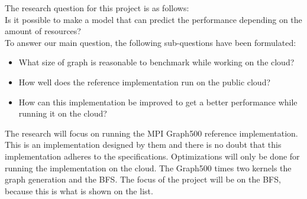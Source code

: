The research question for this project is as follows: \\
Is it possible to make a model that can predict the performance depending on the amount of resources? \\
To answer our main question, the following sub-questions have been formulated: 
\begin{itemize}
\item What size of graph is reasonable to benchmark while working on the cloud?
\item How well does the reference implementation\cite{graph500-code} run on the public cloud?
\item How can this implementation be improved to get a better performance while running it on the cloud?
\end{itemize}

The research will focus on running the MPI Graph500 reference implementation. This is an implementation designed by them and there is no doubt that this implementation adheres to the specifications. Optimizations will only be done for running the implementation on the cloud.
The Graph500 times two kernels the graph generation and the BFS. The focus of the project will be on the BFS, because this is what is shown on the list. %